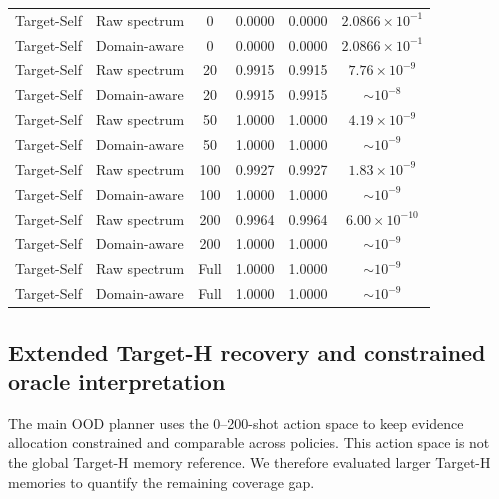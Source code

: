 \documentclass[final,1p,times]{elsarticle}
\begin{document}
\begin{table}[htbp!]
\begin{tabular}{llcccc}
\midrule
Target-Self & Raw spectrum & 0 & 0.0000 & 0.0000 & $2.0866\times10^{-1}$ \\
Target-Self & Domain-aware & 0 & 0.0000 & 0.0000 & $2.0866\times10^{-1}$ \\
Target-Self & Raw spectrum & 20 & 0.9915 & 0.9915 & $7.76\times10^{-9}$ \\
Target-Self & Domain-aware & 20 & 0.9915 & 0.9915 & $\sim10^{-8}$ \\
Target-Self & Raw spectrum & 50 & 1.0000 & 1.0000 & $4.19\times10^{-9}$ \\
Target-Self & Domain-aware & 50 & 1.0000 & 1.0000 & $\sim10^{-9}$ \\
Target-Self & Raw spectrum & 100 & 0.9927 & 0.9927 & $1.83\times10^{-9}$ \\
Target-Self & Domain-aware & 100 & 1.0000 & 1.0000 & $\sim10^{-9}$ \\
Target-Self & Raw spectrum & 200 & 0.9964 & 0.9964 & $6.00\times10^{-10}$ \\
Target-Self & Domain-aware & 200 & 1.0000 & 1.0000 & $\sim10^{-9}$ \\
Target-Self & Raw spectrum & Full & 1.0000 & 1.0000 & $\sim10^{-9}$ \\
Target-Self & Domain-aware & Full & 1.0000 & 1.0000 & $\sim10^{-9}$ \\
\bottomrule
\end{tabular}
\end{table}

\subsection{Extended Target-H recovery and constrained oracle interpretation}

The main OOD planner uses the 0--200-shot action space to keep evidence allocation constrained and comparable across policies. This action space is not the global Target-H memory reference. We therefore evaluated larger Target-H memories to quantify the remaining coverage gap.
\end{document}
